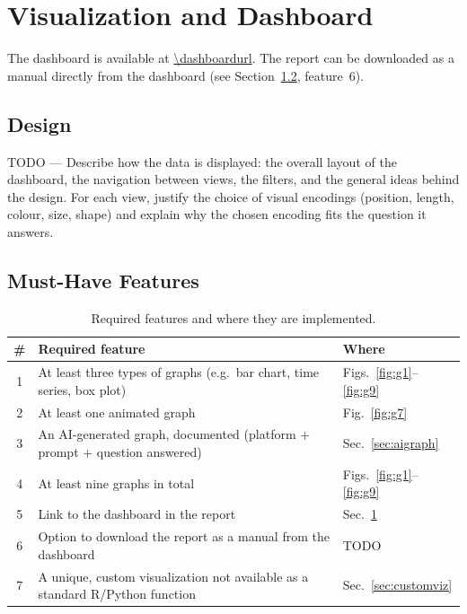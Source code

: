 \section{Visualization and Dashboard}
\label{sec:visualization}

\noindent The dashboard is available at \url{\dashboardurl}. The report can be
downloaded as a manual directly from the dashboard (see
Section~\ref{sec:musthaves}, feature~6).

\subsection{Design}
\label{sec:design}

TODO --- Describe how the data is displayed: the overall layout of the
dashboard, the navigation between views, the filters, and the general
ideas behind the design. For each view, justify the choice of visual
encodings (position, length, colour, size, shape) and explain why the
chosen encoding fits the question it answers.

\subsection{Must-Have Features}
\label{sec:musthaves}

\begin{table}[H]
\centering
\caption{Required features and where they are implemented.}
\label{tab:musthaves}
\begin{tabularx}{\textwidth}{@{}c X l@{}}
\toprule
\textbf{\#} & \textbf{Required feature} & \textbf{Where} \\
\midrule
1 & At least three types of graphs (e.g.\ bar chart, time series, box plot) & Figs.~\ref{fig:g1}--\ref{fig:g9} \\
2 & At least one animated graph & Fig.~\ref{fig:g7} \\
3 & An AI-generated graph, documented (platform + prompt + question answered) & Sec.~\ref{sec:aigraph} \\
4 & At least nine graphs in total & Figs.~\ref{fig:g1}--\ref{fig:g9} \\
5 & Link to the dashboard in the report & Sec.~\ref{sec:visualization} \\
6 & Option to download the report as a manual from the dashboard & TODO \\
7 & A unique, custom visualization not available as a standard R/Python function & Sec.~\ref{sec:customviz} \\
\bottomrule
\end{tabularx}
\end{table}

